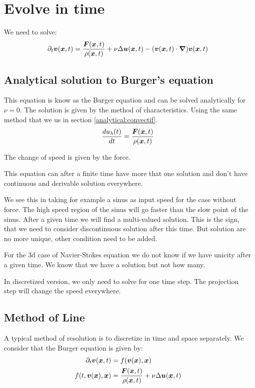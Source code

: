 \section{Evolve in time}

We need to solve:
  \begin{equation}
   \partial_t {\boldsymbol {v}}({\boldsymbol {x}} ,t)=\frac{{\boldsymbol {F}}({\boldsymbol {x}},t)}{\rho({\boldsymbol {x}},t)}+\nu \Delta {\boldsymbol {u}}({\boldsymbol {x}},t)-({\boldsymbol {v}}({\boldsymbol {x}},t)\cdot{\boldsymbol {\nabla}} ) {\boldsymbol {v}}({\boldsymbol {x}} ,t)
  \end{equation}
  
  \subsection{Analytical solution to Burger's equation}
  This equation is know as the Burger equation and can be solved analytically for $\nu=0$.
  The solution is given by the method of characteristics. Using the same method that we us in section \ref{analytical:convectif}.
  \begin{equation}
   \frac{d u_{\lambda}(t)}{dt}=\frac{{\boldsymbol {F}}({\boldsymbol {x}},t)}{\rho({\boldsymbol {x}},t)}
  \end{equation}
  
  The change of speed is given by the force.
  
  This equation can after a finite time have more that one solution and don't have continuous and derivable solution everywhere.
  
  We see this in taking for example a sinus as input speed for the case without force.
  The high speed region of the sinus will go faster than the slow point of the sinus.
  After a given time we will find a multi-valued solution. This is the sign, that we need to consider discontinuous solution after this time.
  But solution are no more unique, other condition need to be added.
  
  For the 3d case of Navier-Stokes equation we do not know if we have unicity after a given time.
  We know that we have a solution but not how many.
  
  In discretized version, we only need to solve for one time step.
  The projection step will change the speed everywhere.

  \subsection{Method of Line}
  
  A typical method of resolution is to discretize in time and space separately.
  We consider that the Burger equation is given by:
  \begin{align}
   \label{fixed:lineA}
   \partial_t {\boldsymbol {v}}({\boldsymbol {x}} ,t)&=f({\boldsymbol {v}}({\boldsymbol {x}}),{\boldsymbol {x}})\\
   \label{fixed:lineB}
   f(t,{\boldsymbol {v}}({\boldsymbol {x}}),{\boldsymbol {x}})&=\frac{{\boldsymbol {F}}({\boldsymbol {x}},t)}{\rho({\boldsymbol {x}},t)}+\nu \Delta {\boldsymbol {u}}({\boldsymbol {x}},t)
  \end{align}
  
